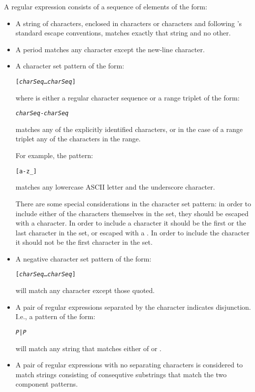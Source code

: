 A regular expression consists of a sequence of elements of the form:
\begin{itemize}
\item
A string of characters, enclosed in  characters or  characters and following \go's standard escape conventions, matches exactly that string and no other.
\item
A period matches any character except the new-line character.
\item
A character set pattern of the form:
\begin{alltt}
[\emph{charSeq}\ldots\emph{charSeq}]
\end{alltt}
where  is either a regular \go character sequence or a range triplet of the form:
\begin{alltt}
\emph{charSeq}-\emph{charSeq}
\end{alltt}
matches any of the explicitly identified characters, or in the case of a range triplet any of the characters in the range.

For example, the pattern:
\begin{alltt}
[a-z_]
\end{alltt}
matches any lowercase ASCII letter and the underscore character.

There are some special considerations in the character set pattern: in order to include either of the \q{[]} characters themselves in the set, they should be escaped with a \bsl{} character. In order to include a \q{-} character it should be the first or the last character in the set, or escaped with a \bsl. In order to include the \q{\uphat} character it should not be the first character in the set.

\item
A negative character set pattern of the form:
\begin{alltt}
[\upht\emph{charSeq}\ldots\emph{charSeq}]
\end{alltt}
will match any character except those quoted.

\item
A pair of regular expressions separated by the \q{|} character indicates disjunction. I.e., a pattern of the form:
\begin{alltt}
\emph{P}|\emph{P}
\end{alltt}
will match any string that matches either of  or .

\item
A pair of regular expressions with no separating characters is considered to match strings consisting of consequtive substrings that match the two component patterns.


\end{itemize}
